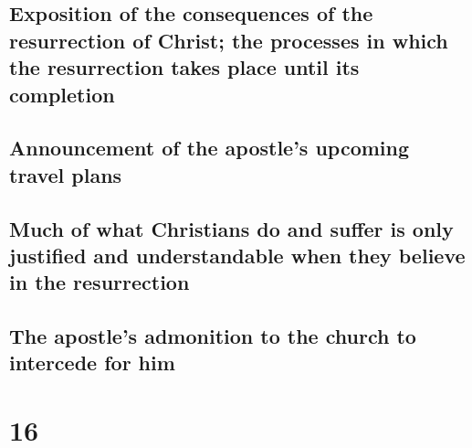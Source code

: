 \hypertarget{exposition-of-the-consequences-of-the-resurrection-of-christ-the-processes-in-which-the-resurrection-takes-place-until-its-completion}{%
\subsection{Exposition of the consequences of the resurrection of
Christ; the processes in which the resurrection takes place until its
completion}\label{exposition-of-the-consequences-of-the-resurrection-of-christ-the-processes-in-which-the-resurrection-takes-place-until-its-completion}}

\hypertarget{announcement-of-the-apostles-upcoming-travel-plans}{%
\subsection{Announcement of the apostle's upcoming travel
plans}\label{announcement-of-the-apostles-upcoming-travel-plans}}

\hypertarget{much-of-what-christians-do-and-suffer-is-only-justified-and-understandable-when-they-believe-in-the-resurrection}{%
\subsection{Much of what Christians do and suffer is only justified and
understandable when they believe in the
resurrection}\label{much-of-what-christians-do-and-suffer-is-only-justified-and-understandable-when-they-believe-in-the-resurrection}}

\hypertarget{the-apostles-admonition-to-the-church-to-intercede-for-him}{%
\subsection{The apostle's admonition to the church to intercede for
him}\label{the-apostles-admonition-to-the-church-to-intercede-for-him}}

\hypertarget{section-15}{%
\section{16}\label{section-15}}

